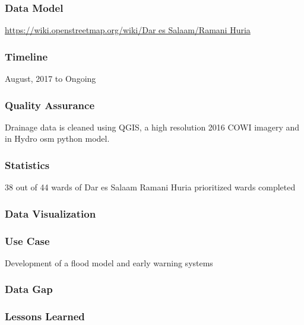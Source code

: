 \documentclass[a4paper,12pt,twoside]{article}
\begin{document}
\subsubsection{Data Model}
\href{https://wiki.openstreetmap.org/wiki/Dar_es_Salaam/Ramani_Huria}{https://wiki.openstreetmap.org/wiki/Dar es Salaam/Ramani Huria}

\subsubsection{Timeline}
August, 2017 to Ongoing

\subsubsection{Quality Assurance}

Drainage data is cleaned using QGIS, a high resolution 2016 COWI imagery and in Hydro osm python model.

\subsubsection{Statistics}
38 out of 44 wards of Dar es Salaam Ramani Huria prioritized wards completed

\subsubsection{Data Visualization}

\subsubsection{Use Case}
Development of a flood model and early warning systems

\subsubsection{Data Gap}

\subsubsection{Lessons Learned}

\newpage
\end{document}
